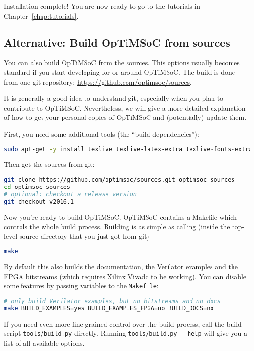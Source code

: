 \medskip
Installation complete!
You are now ready to go to the tutorials in Chapter~\ref{chap:tutorials}.


\subsection{Alternative: Build OpTiMSoC from sources}

You can also build OpTiMSoC from the sources. This options usually
becomes standard if you start developing for or around OpTiMSoC. The
build is done from one git repository:
\url{https://github.com/optimsoc/sources}.

It is generally a good idea to understand git, especially when you
plan to contribute to OpTiMSoC. Nevertheless, we will give a more
detailed explanation of how to get your personal copies of OpTiMSoC
and (potentially) update them.

First, you need some additional tools (the ``build dependencies''):
\begin{lstlisting}[language=sh]
sudo apt-get -y install texlive texlive-latex-extra texlive-fonts-extra
\end{lstlisting}

Then get the sources from git:
\begin{lstlisting}[language=sh]
git clone https://github.com/optimsoc/sources.git optimsoc-sources
cd optimsoc-sources
# optional: checkout a release version
git checkout v2016.1
\end{lstlisting}

Now you're ready to build OpTiMSoC.
OpTiMSoC contains a Makefile which controls the whole build process.
Building is as simple as calling (inside the top-level source directory that you just got from git)

\begin{lstlisting}[language=sh]
make
\end{lstlisting}

By default this also builds the documentation, the Verilator examples and the FPGA bitstreams (which requires Xilinx Vivado to be working).
You can disable some features by passing variables to the \verb|Makefile|:

\begin{lstlisting}[language=sh]
# only build Verilator examples, but no bitstreams and no docs
make BUILD_EXAMPLES=yes BUILD_EXAMPLES_FPGA=no BUILD_DOCS=no
\end{lstlisting}

If you need even more fine-grained control over the build process, call the build script \verb|tools/build.py| directly.
Running \verb|tools/build.py --help| will give you a list of all available options.

